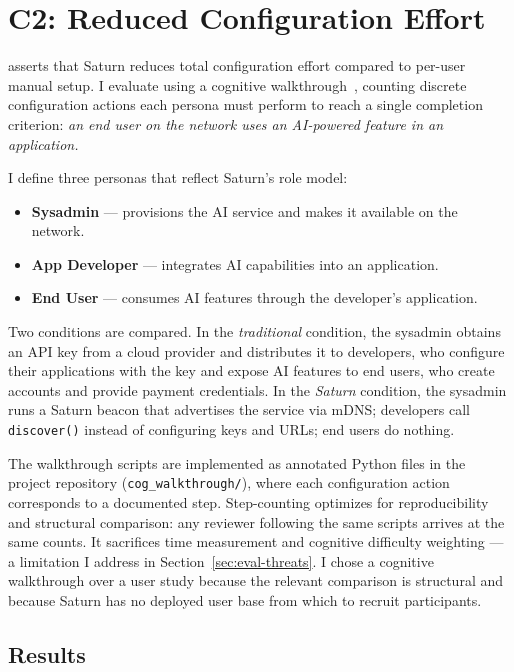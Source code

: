 \section{C2: Reduced Configuration Effort}
\label{sec:eval-c2}

 asserts that Saturn reduces total configuration effort compared to per-user manual setup. I evaluate  using a cognitive walkthrough~\cite{wharton1994walkthrough}, counting discrete configuration actions each persona must perform to reach a single completion criterion: \emph{an end user on the network uses an AI-powered feature in an application.}

I define three personas that reflect Saturn's role model:

\begin{itemize}
  \item \textbf{Sysadmin} --- provisions the AI service and makes it available on the network.
  \item \textbf{App Developer} --- integrates AI capabilities into an application.
  \item \textbf{End User} --- consumes AI features through the developer's application.
\end{itemize}

Two conditions are compared. In the \emph{traditional} condition, the sysadmin obtains an API key from a cloud provider and distributes it to developers, who configure their applications with the key and expose AI features to end users, who create accounts and provide payment credentials. In the \emph{Saturn} condition, the sysadmin runs a Saturn beacon that advertises the service via mDNS; developers call \texttt{discover()} instead of configuring keys and URLs; end users do nothing.

The walkthrough scripts are implemented as annotated Python files in the project repository (\texttt{cog\_walkthrough/}), where each configuration action corresponds to a documented step. Step-counting optimizes for reproducibility and structural comparison: any reviewer following the same scripts arrives at the same counts. It sacrifices time measurement and cognitive difficulty weighting --- a limitation I address in Section~\ref{sec:eval-threats}. I chose a cognitive walkthrough over a user study because the relevant comparison is structural and because Saturn has no deployed user base from which to recruit participants.

\subsection{Results}

